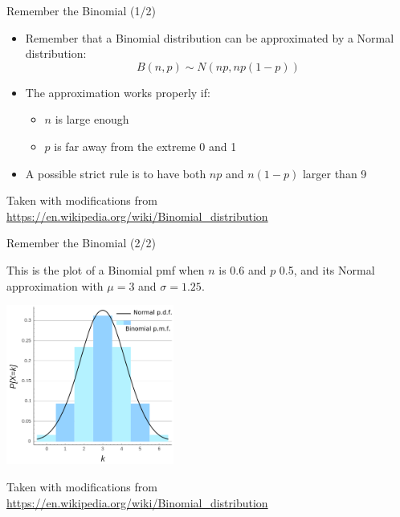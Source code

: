 \documentclass{beamer}
\begin{document}
\begin{frame}
{\centerline{Remember the Binomial (1/2)}}

\begin{itemize}
   \item Remember that a Binomial distribution can be approximated by a Normal distribution:
   $$ B(n,p) \sim N(np, np(1-p)) $$
   \item The approximation works properly if:
    \begin{itemize}
        \item $n$ is large enough
        \item $p$ is far away from the extreme 0 and 1
    \end{itemize}
    \item A possible strict rule is to have both $np$ and $n(1-p)$ larger than 9
\end{itemize}

\begin{center}
\tiny{Taken with modifications from \url{https://en.wikipedia.org/wiki/Binomial_distribution}}
\end{center}

\end{frame}

\begin{frame}
{\centerline{Remember the Binomial (2/2)}}

This is the plot of a Binomial pmf when $n$ is 0.6 and $p$ 0.5, and its Normal approximation with $\mu = 3$ and $\sigma = 1.25$.

\begin{center}
\includegraphics[width=5.5cm]{P2023.AIBCCSS.InferenceAndLogisticRegression/500px-Binomial_Distribution.png}
\end{center}


\begin{center}
\tiny{Taken with modifications from \url{https://en.wikipedia.org/wiki/Binomial_distribution}}
\end{center}

\end{frame}
\end{document}
